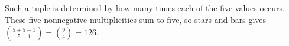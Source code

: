 Such a tuple is determined by how many times each of the five values occurs. These five nonnegative multiplicities sum to five, so stars and bars gives $\binom{5+5-1}{5-1}=\binom94=\boxed{126}$.
